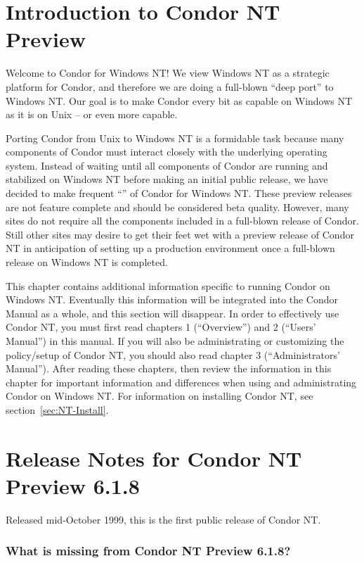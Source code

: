 \section{Introduction to Condor NT Preview}
Welcome to Condor for Windows NT!  
We view Windows NT as a strategic platform for Condor, and therefore we are
doing a full-blown ``deep port'' to Windows NT.
Our goal is to make Condor every bit as capable on Windows NT as it is on
Unix -- or even more capable.  

Porting Condor from Unix to Windows NT is a formidable task because many
components of Condor must interact closely with the underlying operating
system.  Instead of waiting until all components of Condor are running and
stabilized on Windows NT before making an initial public release, we have
decided to make frequent ``'' of Condor for Windows
NT.  These preview releases are not feature complete and should be
considered beta quality.  However, many sites do not require all the
components included in a full-blown release of Condor.  Still other sites
may desire to get their feet wet with a preview release of Condor NT in
anticipation of setting up a production environment once a full-blown
release on Windows NT is completed.

This chapter contains additional information specific to running Condor on
Windows NT.  Eventually this information will be integrated into the Condor
Manual as a whole, and this section will disappear.  In order to effectively
use Condor NT, you must first read chapters 1 (``Overview'') and 2 (``Users'
Manual'') in this
manual.  If you will also be administrating or customizing the policy/setup of
Condor NT, you should also read chapter 3 (``Administrators' Manual'').
After reading these chapters, then review the information in this chapter
for important information and differences when using and administrating
Condor on Windows NT.  For information on installing Condor NT, see
section~\ref{sec:NT-Install}.


\section{Release Notes for Condor NT Preview 6.1.8}

Released mid-October 1999, this is the first public release of Condor NT.

\subsubsection{What is missing from Condor NT Preview 6.1.8?}

